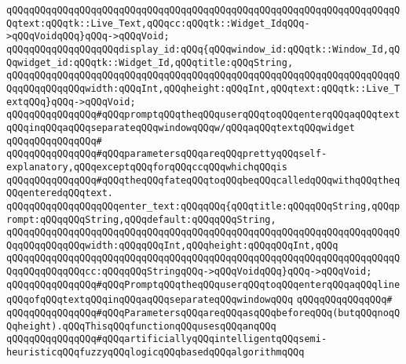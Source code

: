 \verb|qQQqqQQqqQQqqQQqqQQqqQQqqQQqqQQqqQQqqQQqqQQqqQQqqQQqqQQqqQQqqQQqqQQqqQQqtext:qQQqtk::Live_Text,qQQqcc:qQQqtk::Widget_IdqQQq->qQQqVoidqQQq}qQQq->qQQqVoid;|\newline
\newline
\verb|qQQqqQQqqQQqqQQqqQQqdisplay_id:qQQq{qQQqwindow_id:qQQqtk::Window_Id,qQQqwidget_id:qQQqtk::Widget_Id,qQQqtitle:qQQqString,|\newline
\verb|qQQqqQQqqQQqqQQqqQQqqQQqqQQqqQQqqQQqqQQqqQQqqQQqqQQqqQQqqQQqqQQqqQQqqQQqqQQqqQQqqQQqwidth:qQQqInt,qQQqheight:qQQqInt,qQQqtext:qQQqtk::Live_TextqQQq}qQQq->qQQqVoid;|\newline
\newline
\verb|qQQqqQQqqQQqqQQq#qQQqpromptqQQqtheqQQquserqQQqtoqQQqenterqQQqaqQQqtextqQQqinqQQqaqQQqseparateqQQqwindowqQQqw/qQQqaqQQqtextqQQqwidget|\newline
\verb|qQQqqQQqqQQqqQQq#|\newline
\verb|qQQqqQQqqQQqqQQq#qQQqparametersqQQqareqQQqprettyqQQqself-explanatory,qQQqexceptqQQqforqQQqccqQQqwhichqQQqis|\newline
\verb|qQQqqQQqqQQqqQQq#qQQqtheqQQqfateqQQqtoqQQqbeqQQqcalledqQQqwithqQQqtheqQQqenteredqQQqtext.|\newline
\newline
\newline
\verb|qQQqqQQqqQQqqQQqqQQqenter_text:qQQqqQQq{qQQqtitle:qQQqqQQqString,qQQqprompt:qQQqqQQqString,qQQqdefault:qQQqqQQqString,|\newline
\verb|qQQqqQQqqQQqqQQqqQQqqQQqqQQqqQQqqQQqqQQqqQQqqQQqqQQqqQQqqQQqqQQqqQQqqQQqqQQqqQQqqQQqwidth:qQQqqQQqInt,qQQqheight:qQQqqQQqInt,qQQq|\newline
\verb|qQQqqQQqqQQqqQQqqQQqqQQqqQQqqQQqqQQqqQQqqQQqqQQqqQQqqQQqqQQqqQQqqQQqqQQqqQQqqQQqqQQqcc:qQQqqQQqStringqQQq->qQQqVoidqQQq}qQQq->qQQqVoid;|\newline
\newline
\newline
\verb|qQQqqQQqqQQqqQQq#qQQqPromptqQQqtheqQQquserqQQqtoqQQqenterqQQqaqQQqlineqQQqofqQQqtextqQQqinqQQqaqQQqseparateqQQqwindowqQQq|\newline
\verb|qQQqqQQqqQQqqQQq#|\newline
\verb|qQQqqQQqqQQqqQQq#qQQqParametersqQQqareqQQqasqQQqbeforeqQQq(butqQQqnoqQQqheight).qQQqThisqQQqfunctionqQQqusesqQQqanqQQq|\newline
\verb|qQQqqQQqqQQqqQQq#qQQqartificiallyqQQqintelligentqQQqsemi-heuristicqQQqfuzzyqQQqlogicqQQqbasedqQQqalgorithmqQQq|\newline
